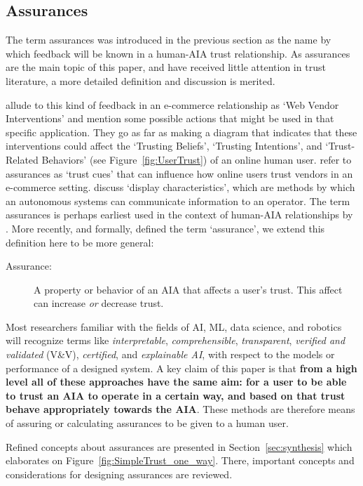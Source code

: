 \subsection{Assurances} \label{sec:assurances}
    The term assurances was introduced in the previous section as the name by which feedback will be known in a human-AIA trust relationship. As assurances are the main topic of this paper, and have received little attention in trust literature, a more detailed definition and discussion is merited.

    \citet{McKnight2001-fa} allude to this kind of feedback in an e-commerce relationship as `Web Vendor Interventions' and mention some possible actions that might be used in that specific application. They go as far as making a diagram that indicates that these interventions could affect the `Trusting Beliefs', `Trusting Intentions', and `Trust-Related Behaviors' (see Figure~\ref{fig:UserTrust}) of an online human user. \citet{Corritore2003-gx} refer to assurances as `trust cues' that can influence how online users trust vendors in an e-commerce setting. \citet{Lee2004-pv} discuss `display characteristics', which are methods by which an autonomous systems can communicate information to an operator. The term assurances is perhaps earliest used in the context of human-AIA relationships by \citet{Sheridan1984-kx}. More recently, and formally, \citet{Lillard2016-yg} defined the term `assurance', we extend this definition here to be more general:    
    \begin{description}
        \item [Assurance:] A property or behavior of an AIA that affects a user's trust. This affect can increase \emph{or} decrease trust. 
    \end{description}

    Most researchers familiar with the fields of AI, ML, data science, and robotics will recognize terms like \emph{interpretable}, \emph{comprehensible}, \emph{transparent}, \emph{verified and validated} (V\&V), \emph{certified}, and \emph{explainable AI}, with respect to the models or performance of a designed system. A key claim of this paper is that \textbf{from a high level all of these approaches have the same aim: for a user to be able to trust an AIA to operate in a certain way, and based on that trust behave appropriately towards the AIA}. These methods are therefore means of assuring or calculating assurances to be given to a human user.

    Refined concepts about assurances are presented in Section~\ref{sec:synthesis} which elaborates on Figure~\ref{fig:SimpleTrust_one_way}. There, important concepts and considerations for designing assurances are reviewed. 
